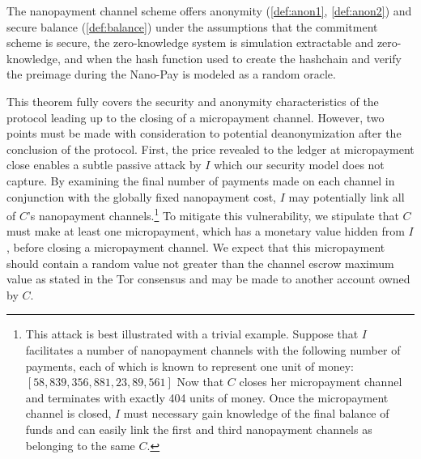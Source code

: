 \begin{theorem}
  The nanopayment channel scheme offers anonymity (\ref{def:anon1},
  \ref{def:anon2}) and secure balance (\ref{def:balance}) under the assumptions
  that the commitment scheme is secure, the zero-knowledge system is simulation
  extractable and zero-knowledge, and when the hash function used to create the
  hashchain and verify the preimage during the Nano-Pay is modeled as a random
  oracle.



\end{theorem}

This theorem fully covers the security and anonymity characteristics of the
protocol leading up to the closing of a micropayment channel. However, two
points must be made with consideration to potential deanonymization after the
conclusion of the protocol. First, the price revealed to the ledger at
micropayment close enables a subtle passive attack by $I$ which our security
model does not capture. By examining the final number of payments made on each
channel in conjunction with the globally fixed nanopayment cost, $I$ may
potentially link all of $C$'s nanopayment channels.\footnote{This attack is best
  illustrated with a trivial example. Suppose that $I$ facilitates a number of
  nanopayment channels with the following number of payments, each of which is
  known to represent one unit of money: $[58, 839, 356, 881, 23, 89, 561]$ Now
  that $C$ closes her micropayment channel and terminates with exactly 404 units
  of money. Once the micropayment channel is closed, $I$ must necessary gain
  knowledge of the final balance of funds and can easily link the first and
  third nanopayment channels as belonging to the same $C$.} To mitigate this
vulnerability, we stipulate that $C$ must make at least one micropayment, which
has a monetary value hidden from $I$, before closing a micropayment channel. We
expect that this micropayment should contain a random value not greater than the
channel escrow maximum value as stated in the Tor consensus and may be made to
another account owned by $C$.


